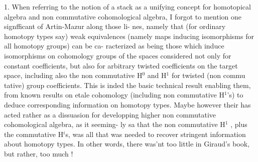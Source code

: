 1.  When referring  to the notion of a stack as a unifying concept
for homotopical algebra and non commutative cohomological algebra,  I
forgot to mention one signfficant  of Artin-Mazur along those li-%
nes,  namely that (for ordinary homotopy types say) weak equivalences
(namely maps inducing isomorphisms for all homotopy groups)  can be ca-%
racterized as being those which induce isomorphisms on cohomology groups
 of the spaces considered not only for constant coefficients,  but
also for  arbitrary twisted coefficients on the target space,
including also the non commutative H$^{0}$ and H$^{1}$ for twisted  (non commu%
tative) group coefficients.  This is inded the basic technical result
enabling them,  from known results on etale cohomology (including non
commutative H$^{1}$'s) to deduce corresponding information on homotopy types.
Maybe however  their  has acted rather as a dissuasion for
developping higher non commutative cohomological algebra,  as it seeming-%
\margin{-}ly sa that the non commutative H$^{1}$ ,  plus the commutative H$^{i}$s, was
all that was needed to recover stringent information about homotopy
types.  In other words,  there was'nt too little in Giraud's book,
but rather,  too much !
